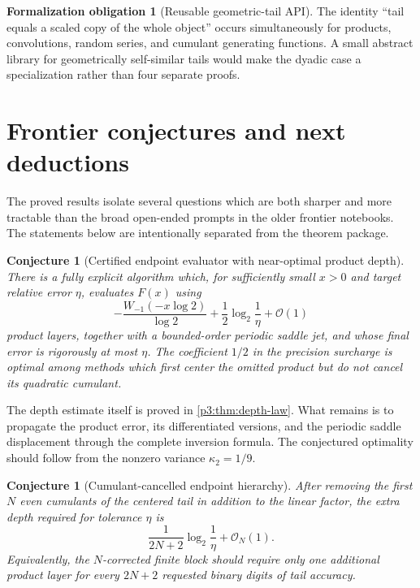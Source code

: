 \documentclass[11pt,oneside]{article}
\numberwithin{equation}{section}
\newtheorem{conjecture}[theorem]{Conjecture}
\theoremstyle{definition}
\newtheorem{obligation}[theorem]{Formalization obligation}
\theoremstyle{remark}
\newcommand{\bigO}{\mathcal O}
\begin{document}
\begin{obligation}[Reusable geometric-tail API]
The identity ``tail equals a scaled copy of the whole object'' occurs simultaneously for
products, convolutions, random series, and cumulant generating functions.  A small abstract
library for geometrically self-similar tails would make the dyadic case a specialization
rather than four separate proofs.
\end{obligation}

\section{Frontier conjectures and next deductions}
\label{p3:sec:frontiers}

The proved results isolate several questions which are both sharper and more tractable than
the broad open-ended prompts in the older frontier notebooks.  The statements below are
intentionally separated from the theorem package.

\begin{conjecture}[Certified endpoint evaluator with near-optimal product depth]
\label{p3:conj:endpoint-evaluator}
There is a fully explicit algorithm which, for sufficiently small $x>0$ and target relative
error $\eta$, evaluates $F(x)$ using
\begin{equation}
 -\frac{W_{-1}(-x\log2)}{\log2}
 +\frac12\log_2\frac1\eta+\bigO(1)
 \label{p3:eq:conj-depth}
\end{equation}
product layers, together with a bounded-order periodic saddle jet, and whose final error is
rigorously at most $\eta$.  The coefficient $1/2$ in the precision surcharge is optimal among
methods which first center the omitted product but do not cancel its quadratic cumulant.
\end{conjecture}

The depth estimate itself is proved in \cref{p3:thm:depth-law}.  What remains is to propagate the
product error, its differentiated versions, and the periodic saddle displacement through the
complete inversion formula.  The conjectured optimality should follow from the nonzero
variance $\kappa_2=1/9$.

\begin{conjecture}[Cumulant-cancelled endpoint hierarchy]
\label{p3:conj:cumulant-depth}
After removing the first $N$ even cumulants of the centered tail in addition to the linear
factor, the extra depth required for tolerance $\eta$ is
\begin{equation}
 \frac{1}{2N+2}\log_2\frac1\eta+\bigO_N(1).
 \label{p3:eq:cumulant-depth-conj}
\end{equation}
Equivalently, the $N$-corrected finite block should require only one additional product layer
for every $2N+2$ requested binary digits of tail accuracy.
\end{conjecture}
\end{document}
